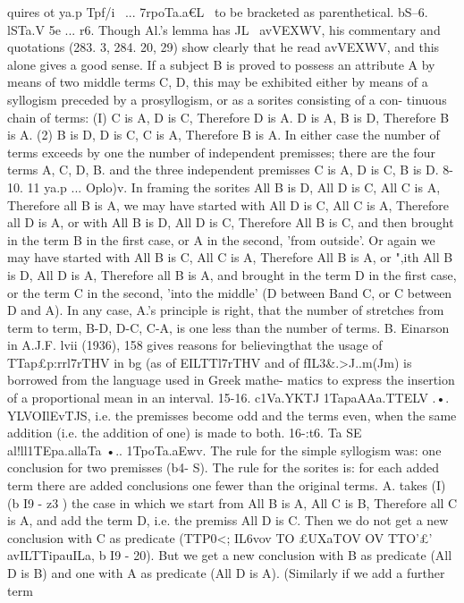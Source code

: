 {{{{{{{{{{{{{{{{quires ot ya.p Tpf/i~ ... 7rpoTa.a€L~ to be bracketed as parenthetical.
bS--6. lSTa.V 5e ... r6. Though Al.'s lemma has JL~ avVEXWV, his
commentary and quotations (283. 3, 284. 20, 29) show clearly that
he read avVEXWV, and this alone gives a good sense. If a subject
B is proved to possess an attribute A by means of two middle
terms C, D, this may be exhibited either by means of a syllogism
preceded by a prosyllogism, or as a sorites consisting of a con-
tinuous chain of terms: (I) C is A, D is C, Therefore D is A.
D is A, B is D, Therefore B is A. (2) B is D, D is C, C is A,
Therefore B is A. In either case the number of terms exceeds
by one the number of independent premisses; there are the four
terms A, C, D, B. and the three independent premisses C is A,
D is C, B is D.
8-10. 11 ya.p ... Oplo)v. In framing the sorites All B is D, All
D is C, All C is A, Therefore all B is A, we may have started with
All D is C, All C is A, Therefore all D is A, or with All B is D,
All D is C, Therefore All B is C, and then brought in the term B
in the first case, or A in the second, 'from outside'. Or again we
may have started with All B is C, All C is A, Therefore All B
is A, or ",ith All B is D, All D is A, Therefore all B is A, and
brought in the term D in the first case, or the term C in the
second, 'into the middle' (D between Band C, or C between D
and A). In any case, A.'s principle is right, that the number of
stretches from term to term, B-D, D-C, C-A, is one less than
the number of terms.
B. Einarson in A.J.F. lvii (1936), 158 gives reasons for believingthat the usage of TTap£p:rrl7rTHV in bg (as of EILTTl7rTHV and of
fIL{3&.>J..m(Jm) is borrowed from the language used in Greek mathe-
matics to express the insertion of a proportional mean in an interval.
15-16. c1Va.YKTJ 1TapaAAa.TTELV .•. YLVOIlEvTJS, i.e. the premisses
become odd and the terms even, when the same addition (i.e.
the addition of one) is made to both.
16-:t6. Ta SE al!ll1TEpa.allaTa •.. 1TpoTa.aEwv. The rule for the
simple syllogism was: one conclusion for two premisses (b4- S).
The rule for the sorites is: for each added term there are added
conclusions one fewer than the original terms. A. takes (I)
(b I9 - z3 ) the case in which we start from All B is A, All C is B,
Therefore all C is A, and add the term D, i.e. the premiss All
D is C. Then we do not get a new conclusion with C as predicate
(TTP0<; IL6vov TO £UXaTOV OV TTO'£' avILTTipauILa, b I9 - 20). But we get
a new conclusion with B as predicate (All D is B) and one with
A as predicate (All D is A). (Similarly if we add a further term
}}}}}}}}}}}}}}}}}
